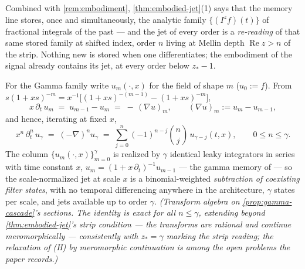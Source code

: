 \begin{remark}\label{rem:reindexing}
Combined with \ref{rem:embodiment}, \ref{thm:embodied-jet}(1) says that the
memory line stores, once and simultaneously, the analytic family $\{(I^{z} f)(t)\}$ of
fractional integrals of the past --- and the jet of every order is a \emph{re-reading} of that
same stored family at shifted index, order $n$ living at Mellin depth
$\operatorname{Re} z > n$ of the strip. Nothing new is stored when one differentiates; the
embodiment of the signal already contains its jet, at every order below $z_* - 1$.
\end{remark}

\begin{proposition}\label{prop:gamma-jets}
For the Gamma family write $u_m(\cdot, x)$ for the field of shape $m$ ($u_0 := f$). From
$s(1 + xs)^{-m} = x^{-1}\bigl[(1 + xs)^{-(m-1)} - (1 + xs)^{-m}\bigr]$,
\[
  x\,\partial_t\, u_m \;=\; u_{m-1} - u_m \;=\; -\,(\nabla u)_m,
  \qquad (\nabla u)_m := u_m - u_{m-1},
\]
and hence, iterating at fixed $x$,
\[
  x^n\,\partial_t^n\, u_\gamma \;=\; (-\nabla)^n u_\gamma
  \;=\; \sum_{j=0}^{n} (-1)^{n-j}\binom{n}{j}\, u_{\gamma - j}(t, x),
  \qquad 0 \le n \le \gamma .
\]
The column $\{u_m(\cdot, x)\}_{m=0}^{\gamma}$ is realized by $\gamma$ identical leaky
integrators in series with time constant $x$, $u_m = (1 + x\,\partial_t)^{-1} u_{m-1}$ --- the
gamma memory of  --- so the scale-normalized jet at scale $x$ is a
binomial-weighted \emph{subtraction of coexisting filter states}, with no temporal
differencing anywhere in the architecture, $\gamma$ states per scale, and jets available up
to order $\gamma$.
\statusT\quad\emph{(Transform algebra on \ref{prop:gamma-cascade}'s sections. The identity
is exact for all $n \le \gamma$, extending beyond \ref{thm:embodied-jet}'s strip condition
--- the transforms are rational and continue meromorphically --- consistently with
$z_* = \gamma$ marking the strip reading; the relaxation of (H) by meromorphic
continuation is among the open problems the paper records.)}
\end{proposition}


